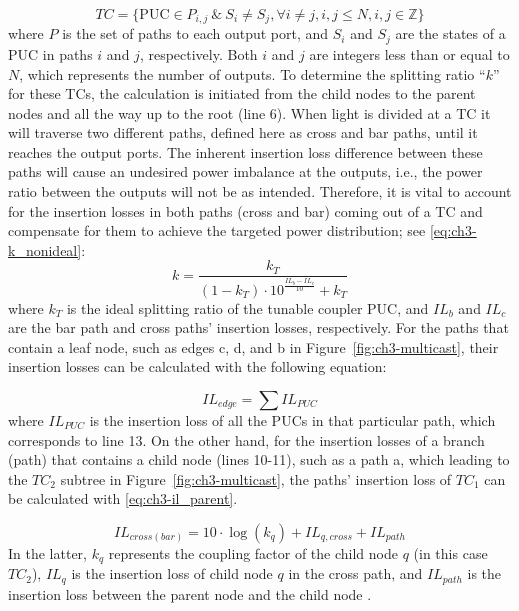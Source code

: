 \begin{equation}
    TC = \{ \text{PUC} \in P_{i,j} \ \& \ S_i \neq S_j, \forall i \neq j, i, j \leq N, i, j \in \mathbb{Z} \}
    \label{eq:ch3-t_c}
\end{equation}
where $P$ is the set of paths to each output port, and $S_i$ and $S_j$ are the states of a PUC in paths $i$ and $j$, respectively.
Both $i$ and $j$ are integers less than or equal to $N$, which represents the number of outputs.
To determine the splitting ratio ``$k$'' for these TCs, the calculation is initiated from the child nodes to the parent nodes and all the way up to the root (line 6).
When light is divided at a TC it will traverse two different paths, defined here as cross and bar paths, until it reaches the output ports.
The inherent insertion loss difference between these paths will cause an undesired power imbalance at the outputs, i.e., the power ratio between the outputs will not be as intended.
Therefore, it is vital to account for the insertion losses in both paths (cross and bar) coming out of a TC and compensate for them to achieve the targeted power distribution; see \eqref{eq:ch3-k_nonideal}:
\begin{equation}
    k = \frac{k_T}{(1 - k_T) \cdot 10^{\frac{IL_b - IL_c}{10}} + k_T}
    \label{eq:ch3-k_nonideal}
\end{equation}
where \(k_T\) is the ideal splitting ratio of the tunable coupler PUC, and \(IL_b\) and \(IL_c\) are the bar path and cross paths' insertion losses, respectively.
For the paths that contain a leaf node, such as edges c, d, and b in Figure~\ref{fig:ch3-multicast}, their insertion losses can be calculated with the following equation:

\begin{equation}
    IL_{edge} = \sum IL_{PUC} \label{eq:ch3-il_leaf}
\end{equation}
where \(IL_{PUC}\) is the insertion loss of all the PUCs in that particular path, which corresponds to line 13.
On the other hand, for the insertion losses of a branch (path) that contains a child node (lines 10-11), such as a path a, which leading to the $TC_2$ subtree in Figure~\ref{fig:ch3-multicast}, the paths' insertion loss of $TC_1$ can be calculated with \eqref{eq:ch3-il_parent}.

\begin{equation}
    IL_{cross(bar)} = 10 \cdot \log \left( k_q \right) + IL_{q,cross} + IL_{path} \label{eq:ch3-il_parent}
\end{equation}
In the latter, \(k_q\) represents the coupling factor of the child node $q$ (in this case $TC_2$), \(IL_q\) is the insertion loss of child node $q$ in the cross path, and \(IL_{path}\) is the insertion loss between the parent node and the child node \cite{perez2018delay_line}.

